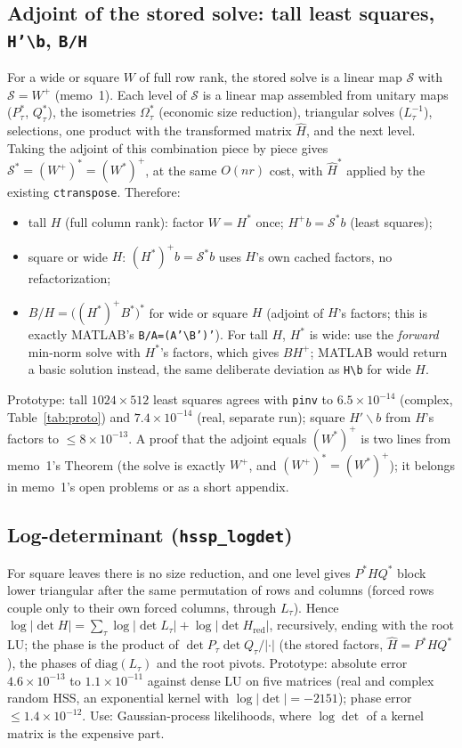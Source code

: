 \documentclass[11pt]{article}
\newcommand{\code}[1]{\texttt{#1}}
\begin{document}
\subsection{Adjoint of the stored solve: tall least squares, \code{H'\textbackslash b}, \code{B/H}}\label{sec:adjoint}
For a wide or square $W$ of full row rank, the stored solve is a linear map $\mathcal S$ with $\mathcal S=W^+$
(memo~1). Each level of $\mathcal S$ is a linear map assembled from unitary maps ($P_\tau^*$, $Q_\tau^*$), the
isometries $\Omega_\tau^*$ (economic size reduction), triangular solves ($L_\tau^{-1}$), selections, one product
with the transformed matrix $\hat H$, and the next level. Taking the adjoint of this combination piece by piece
gives
$\mathcal S^*=(W^+)^*=(W^*)^+$, at the same $O(nr)$ cost, with $\hat H^*$ applied by the existing
\code{ctranspose}. Therefore:
\begin{itemize}
\item tall $H$ (full column rank): factor $W=H^*$ once; $H^+b=\mathcal S^*b$ (least squares);
\item square or wide $H$: $(H^*)^+b=\mathcal S^*b$ uses $H$'s own cached factors, no refactorization;
\item $B/H=\big((H^*)^+B^*\big)^*$ for wide or square $H$ (adjoint of $H$'s factors; this is exactly MATLAB's
\code{B/A=(A'\textbackslash B')'}). For tall $H$, $H^*$ is wide: use the \emph{forward} min-norm solve with $H^*$'s
factors, which gives $B H^+$; MATLAB would return a basic solution instead, the same deliberate deviation as
\code{H\textbackslash b} for wide $H$.
\end{itemize}
Prototype: tall $1024\times512$ least squares agrees with \code{pinv} to $6.5\times10^{-14}$ (complex,
Table~\ref{tab:proto}) and $7.4\times10^{-14}$ (real, separate run); square $H'\backslash b$ from $H$'s factors to $\le8\times10^{-13}$. A proof that the
adjoint equals $(W^*)^+$ is two lines from memo~1's Theorem (the solve is exactly $W^+$, and $(W^+)^*=(W^*)^+$);
it belongs in memo~1's open problems or as a short appendix.

\subsection{Log-determinant (\code{hssp\_logdet})}\label{sec:logdet}
For square leaves there is no size reduction, and one level gives $P^*HQ^*$ block lower triangular after the same
permutation of rows and columns (forced rows couple only to their own forced columns, through $L_\tau$).
Hence $\log|\det H|=\sum_\tau\log|\det L_\tau|+\log|\det H_{\text{red}}|$, recursively, ending with the root LU;
the phase is the product of $\det P_\tau\det Q_\tau/|\cdot|$ (the stored factors, $\hat H=P^*HQ^*$), the phases of
$\mathrm{diag}(L_\tau)$ and the root pivots. Prototype: absolute error $4.6\times10^{-13}$ to $1.1\times10^{-11}$
against dense LU on five matrices (real and complex random HSS, an exponential kernel with $\log|\det|=-2151$);
phase error $\le1.4\times10^{-12}$. Use: Gaussian-process likelihoods,
where $\log\det$ of a kernel matrix is the expensive part.
\end{document}
